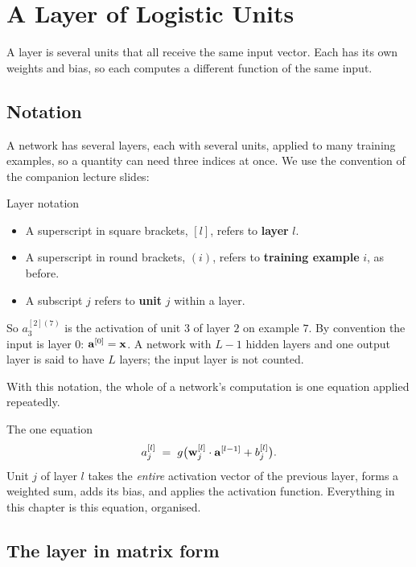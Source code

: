 \section{A Layer of Logistic Units}
\label{sec:layer}

A layer is several units that all receive the same input vector. Each has its
own weights and bias, so each computes a different function of the same input.

\subsection{Notation}

A network has several layers, each with several units, applied to many training
examples, so a quantity can need three indices at once. We use the convention of
the companion lecture slides:

\begin{defbox}{Layer notation}
\begin{itemize}
  \item A superscript in square brackets, $[l]$, refers to \textbf{layer} $l$.
  \item A superscript in round brackets, $(i)$, refers to \textbf{training
        example} $i$, as before.
  \item A subscript $j$ refers to \textbf{unit} $j$ within a layer.
\end{itemize}
So $a^{[2](7)}_3$ is the activation of unit $3$ of layer $2$ on example
$7$. By convention the input is layer $0$: $\mathbf{a}^{[0]} = \mathbf{x}$. A network with
$L-1$ hidden layers and one output layer is said to have $L$ layers; the input
layer is not counted.
\end{defbox}

With this notation, the whole of a network's computation is one equation applied
repeatedly.

\begin{keyinsight}{The one equation}
\[
  a^{[l]}_j \;=\; g\bigl(\mathbf{w}^{[l]}_j\cdot\mathbf{a}^{[l-1]} + b^{[l]}_j\bigr).
\]
Unit $j$ of layer $l$ takes the \emph{entire} activation vector of the previous
layer, forms a weighted sum, adds its bias, and applies the activation function.
Everything in this chapter is this equation, organised.
\end{keyinsight}

\subsection{The layer in matrix form}

